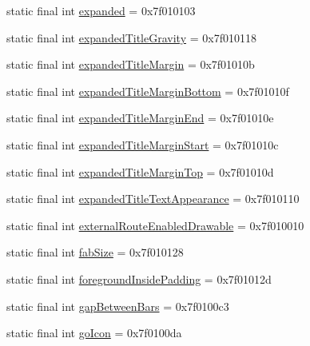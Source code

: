 \begin{CompactItemize}
\item 
static final int \hyperlink{classandroid_1_1support_1_1v7_1_1cardview_1_1_r_1_1attr_79e4daee784f83a51a7fd8f0648af403}{expanded} = 0x7f010103
\item 
static final int \hyperlink{classandroid_1_1support_1_1v7_1_1cardview_1_1_r_1_1attr_92fa0bf84ea82b0adaf4aa3ad62631e0}{expandedTitleGravity} = 0x7f010118
\item 
static final int \hyperlink{classandroid_1_1support_1_1v7_1_1cardview_1_1_r_1_1attr_722af4b71e66aca2501b895c3ff7519e}{expandedTitleMargin} = 0x7f01010b
\item 
static final int \hyperlink{classandroid_1_1support_1_1v7_1_1cardview_1_1_r_1_1attr_a533fb39de01ee901bedc0527287cfbd}{expandedTitleMarginBottom} = 0x7f01010f
\item 
static final int \hyperlink{classandroid_1_1support_1_1v7_1_1cardview_1_1_r_1_1attr_8df870ae7c3b1394a7477b7be747f716}{expandedTitleMarginEnd} = 0x7f01010e
\item 
static final int \hyperlink{classandroid_1_1support_1_1v7_1_1cardview_1_1_r_1_1attr_ba5b35a84ba6f378b40e2e21ccd2179a}{expandedTitleMarginStart} = 0x7f01010c
\item 
static final int \hyperlink{classandroid_1_1support_1_1v7_1_1cardview_1_1_r_1_1attr_4b1afa4e3f8ea65f0b42198fc5655921}{expandedTitleMarginTop} = 0x7f01010d
\item 
static final int \hyperlink{classandroid_1_1support_1_1v7_1_1cardview_1_1_r_1_1attr_b4eb2b2900ce7fd7cfe82d6d2e338ce5}{expandedTitleTextAppearance} = 0x7f010110
\item 
static final int \hyperlink{classandroid_1_1support_1_1v7_1_1cardview_1_1_r_1_1attr_a246be6778c7eead7e20e0fd194ab2a5}{externalRouteEnabledDrawable} = 0x7f010010
\item 
static final int \hyperlink{classandroid_1_1support_1_1v7_1_1cardview_1_1_r_1_1attr_233b4e6346f109f1ba71344f8b825098}{fabSize} = 0x7f010128
\item 
static final int \hyperlink{classandroid_1_1support_1_1v7_1_1cardview_1_1_r_1_1attr_3a6ff577da785a4a52ea3ff7b5703961}{foregroundInsidePadding} = 0x7f01012d
\item 
static final int \hyperlink{classandroid_1_1support_1_1v7_1_1cardview_1_1_r_1_1attr_2d9396b152f09d179f895b9388bdcab4}{gapBetweenBars} = 0x7f0100c3
\item 
static final int \hyperlink{classandroid_1_1support_1_1v7_1_1cardview_1_1_r_1_1attr_d08b0181953f1a3226a20fbc0b75e062}{goIcon} = 0x7f0100da
\item 

\end{CompactItemize}
